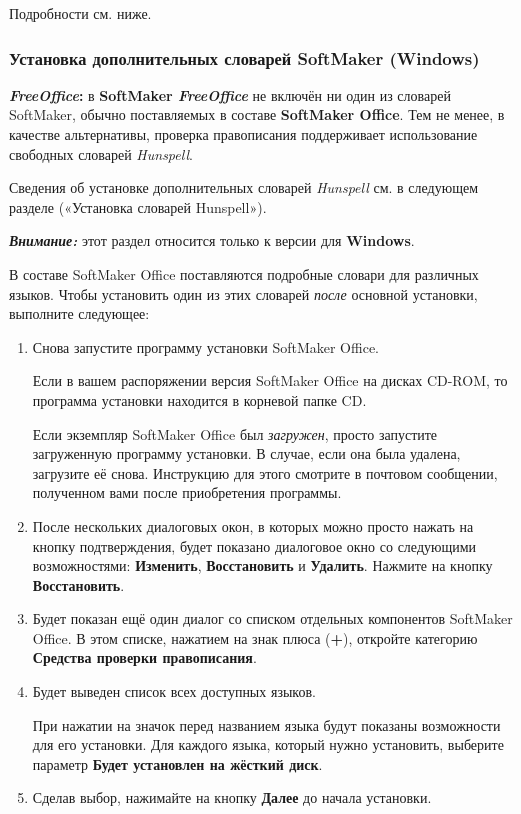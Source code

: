 ﻿\documentclass[a4paper,10pt]{article}
\begin{document}
 Подробности см. ниже.
 
 \subsubsection{Установка дополнительных словарей SoftMaker (Windows)}
  \begin{mdframed}[backgroundcolor=pink!50]
\textbf{\textit{FreeOffice}:} в \textbf{SoftMaker \textit{FreeOffice}} не включён ни один из словарей SoftMaker, обычно поставляемых в составе \textbf{SoftMaker Office}. Тем не менее, в качестве альтернативы, проверка правописания поддерживает использование свободных словарей \textit{Hunspell}.

Сведения об установке дополнительных словарей \textit{Hunspell} см. в следующем разделе («Установка словарей Hunspell»).
\end{mdframed}

\begin{mdframed}[backgroundcolor=blue!10]
\textbf{\textit{Внимание:}} этот раздел относится только к версии для \textbf{Windows}.
\end{mdframed}

В составе SoftMaker Office поставляются подробные словари для различных языков. Чтобы установить один из этих словарей \textit{после} основной установки, выполните следующее:

\begin{enumerate}
 \item Снова запустите программу установки SoftMaker Office.
 
 {\footnotesize Если в вашем распоряжении версия SoftMaker Office на дисках CD-ROM, то программа установки находится в корневой папке CD.
 
 Если экземпляр SoftMaker Office был \textit{загружен}, просто запустите загруженную программу установки. В случае, если она была удалена, загрузите её снова. Инструкцию для этого смотрите в почтовом сообщении, полученном вами после приобретения программы.}
 \item После нескольких диалоговых окон, в которых можно просто нажать на кнопку подтверждения, будет показано диалоговое окно со следующими возможностями: \textbf{Изменить}, \textbf{Восстановить} и \textbf{Удалить}. Нажмите на кнопку \textbf{Восстановить}.
 \item Будет показан ещё один диалог со списком отдельных компонентов SoftMaker Office. В этом списке, нажатием на знак плюса (\textbf{+}), откройте категорию \textbf{Средства проверки правописания}.
 \item Будет выведен список всех доступных языков.
 
 При нажатии на значок перед названием языка будут показаны возможности для его установки. Для каждого языка, который нужно установить, выберите параметр \textbf{Будет установлен на жёсткий диск}.
 \item Сделав выбор, нажимайте на кнопку \textbf{Далее} до начала установки.
\end{enumerate}
\end{document}
